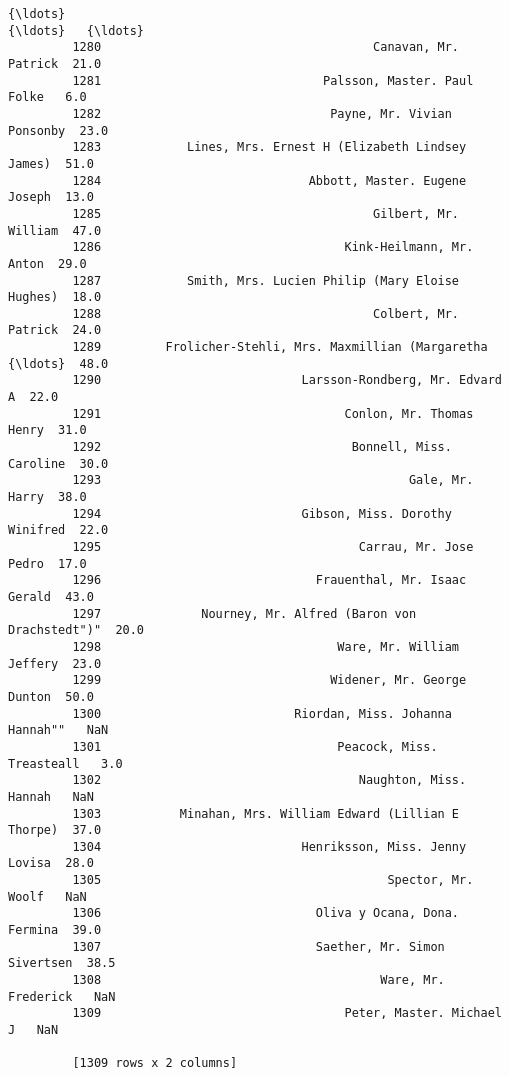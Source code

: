 \documentclass[11pt]{article}
\begin{document}
\begin{Verbatim}[commandchars=\\\{\}]
         {\ldots}                                                        {\ldots}   {\ldots}
         1280                                      Canavan, Mr. Patrick  21.0
         1281                               Palsson, Master. Paul Folke   6.0
         1282                                Payne, Mr. Vivian Ponsonby  23.0
         1283            Lines, Mrs. Ernest H (Elizabeth Lindsey James)  51.0
         1284                             Abbott, Master. Eugene Joseph  13.0
         1285                                      Gilbert, Mr. William  47.0
         1286                                  Kink-Heilmann, Mr. Anton  29.0
         1287            Smith, Mrs. Lucien Philip (Mary Eloise Hughes)  18.0
         1288                                      Colbert, Mr. Patrick  24.0
         1289         Frolicher-Stehli, Mrs. Maxmillian (Margaretha {\ldots}  48.0
         1290                            Larsson-Rondberg, Mr. Edvard A  22.0
         1291                                  Conlon, Mr. Thomas Henry  31.0
         1292                                   Bonnell, Miss. Caroline  30.0
         1293                                           Gale, Mr. Harry  38.0
         1294                            Gibson, Miss. Dorothy Winifred  22.0
         1295                                    Carrau, Mr. Jose Pedro  17.0
         1296                              Frauenthal, Mr. Isaac Gerald  43.0
         1297              Nourney, Mr. Alfred (Baron von Drachstedt")"  20.0
         1298                                 Ware, Mr. William Jeffery  23.0
         1299                                Widener, Mr. George Dunton  50.0
         1300                           Riordan, Miss. Johanna Hannah""   NaN
         1301                                 Peacock, Miss. Treasteall   3.0
         1302                                    Naughton, Miss. Hannah   NaN
         1303           Minahan, Mrs. William Edward (Lillian E Thorpe)  37.0
         1304                            Henriksson, Miss. Jenny Lovisa  28.0
         1305                                        Spector, Mr. Woolf   NaN
         1306                              Oliva y Ocana, Dona. Fermina  39.0
         1307                              Saether, Mr. Simon Sivertsen  38.5
         1308                                       Ware, Mr. Frederick   NaN
         1309                                  Peter, Master. Michael J   NaN
         
         [1309 rows x 2 columns]
\end{Verbatim}
            
\end{document}

